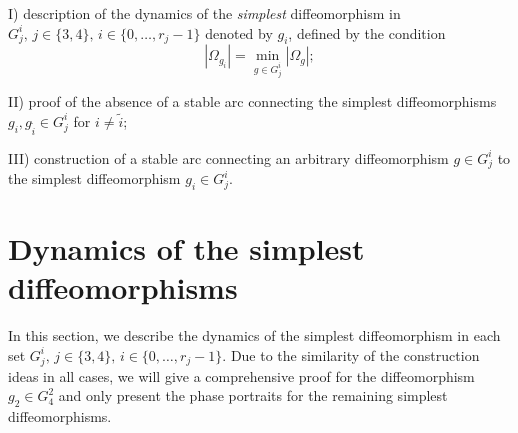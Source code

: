 \documentclass{amsart}
\numberwithin{equation}{section}
\begin{document}
	I) description of the dynamics of the {\it simplest} diffeomorphism in $G_j^i,\,j\in\{3,4\},\,i\in\{0,\dots, r_j-1\}$ denoted by $g_{i}$, defined by the condition 
	\begin{equation}\label{min}
		|\Omega_{g_{i}}|=\min_{g\in G_j^i}|\Omega_g|;
	\end{equation}
	
	II) proof of the absence of a stable arc connecting the simplest diffeomorphisms $g_i,g_{\tilde i}\in G^i_j$ for $i\neq\tilde i$;
	
	III) construction of a stable arc connecting an arbitrary diffeomorphism $g\in G_j^i$ to the simplest diffeomorphism $g_i \in G_j^i$. 
	
	\section{Dynamics of the simplest diffeomorphisms}
	In this section, we describe the dynamics of the simplest diffeomorphism in each set $G_j^i,\,j\in\{3,4\},\,i\in\{0,\dots, r_j-1\}$. Due to the similarity of the construction ideas in all cases, we will give a comprehensive proof for the diffeomorphism $g_{2}\in G_4^2$ and only present the phase portraits for the remaining simplest diffeomorphisms. 
	
\end{document}
